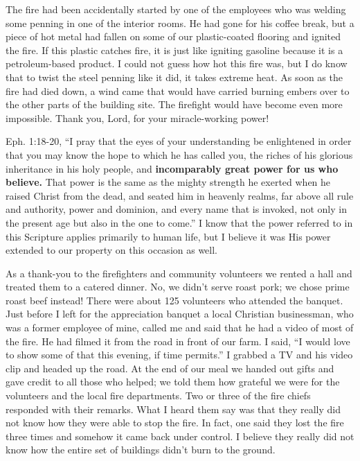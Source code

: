\documentclass[twoside, 12pt]{book}
\begin{document}
The fire had been accidentally started by one of the employees who was welding some penning in one of the interior rooms. He had gone for his coffee break, but a piece of hot metal had fallen on some of our plastic-coated flooring and ignited the fire. If this plastic catches fire, it is just like igniting gasoline because it is a petroleum-based product. I could not guess how hot this fire was, but I do know that to twist the steel penning like it did, it takes extreme heat. As soon as the fire had died down, a wind came that would have carried burning embers over to the other parts of the building site. The firefight would have become even more impossible. Thank you, Lord, for your miracle-working power! 

Eph. 1:18-20, “I pray that the eyes of your understanding be enlightened in order that you may know the hope to which he has called you, the riches of his glorious inheritance in his holy people, and \textbf{incomparably great power for us who believe.} That power is the same as the mighty strength he exerted when he raised Christ from the dead, and seated him in heavenly realms, far above all rule and authority, power and dominion, and every name that is invoked, not only in the present age but also in the one to come.” I know that the power referred to in this Scripture applies primarily to human life, but I believe it was His power extended to our property on this occasion as well. 

As a thank-you to the firefighters and community volunteers we rented a hall and treated them to a catered dinner. No, we didn't serve roast pork; we chose prime roast beef instead! There were about 125 volunteers who attended the banquet. Just before I left for the appreciation banquet a local Christian businessman, who was a former employee of mine, called me and said that he had a video of most of the fire. He had filmed it from the road in front of our farm. I said, “I would love to show some of that this evening, if time permits.” I grabbed a TV and his video clip and headed up the road. At the end of our meal we handed out gifts and gave credit to all those who helped; we told them how grateful we were for the volunteers and the local fire departments. Two or three of the fire chiefs responded with their remarks. What I heard them say was that they really did not know how they were able to stop the fire. In fact, one said they lost the fire three times and somehow it came back under control. I believe they really did not know how the entire set of buildings didn’t burn to the ground.
\end{document}
